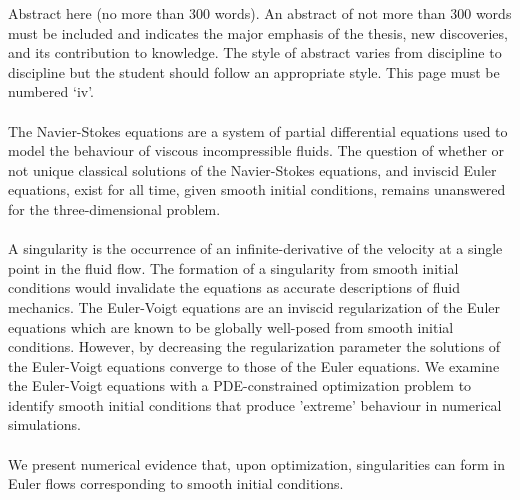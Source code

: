 
Abstract here (no more than 300 words). An abstract of not more than 300 words must be included and indicates the major emphasis of the thesis, new discoveries, and its contribution to knowledge. The style of abstract varies from discipline to discipline but the student should follow an appropriate style. This page must be numbered ‘iv’.
\\~\\
The Navier-Stokes equations are a system of partial differential equations used to model the behaviour of viscous incompressible fluids. The question of whether or not unique classical solutions of the Navier-Stokes equations, and inviscid Euler equations, exist for all time, given smooth initial conditions, remains unanswered for the three-dimensional problem. 
\\~\\
A singularity is the occurrence of an infinite-derivative of the velocity at a single point in the fluid flow. The formation of a singularity from smooth initial conditions would invalidate the equations as accurate descriptions of fluid mechanics. The Euler-Voigt equations are an inviscid regularization of the Euler equations which are known to be globally well-posed from smooth initial conditions. However, by decreasing the regularization parameter the solutions of the Euler-Voigt equations converge to those of the Euler equations. We examine the Euler-Voigt equations with a PDE-constrained optimization problem to identify smooth initial conditions that produce 'extreme' behaviour in numerical simulations. 
\\~\\
{\color{red}We present numerical evidence that, upon optimization, singularities can form in Euler flows corresponding to smooth initial conditions.}